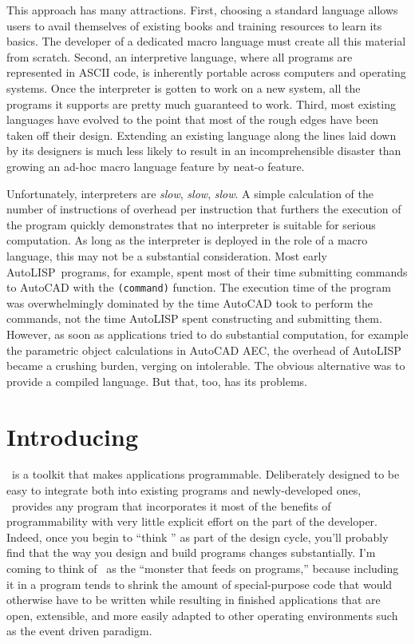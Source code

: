 \documentclass[twocolumn]{article}
\begin{document}
This approach has many attractions.  First, choosing a standard
language allows users to avail themselves of existing books and
training resources to learn its basics.  The developer of a
dedicated macro language must create all this material from scratch.
Second, an interpretive language, where all programs are represented
in ASCII code, is inherently portable across computers and operating
systems.  Once the interpreter is gotten to work on a new system, all
the programs it supports are pretty much guaranteed to work.  Third,
most existing languages have evolved to the point that most of the
rough edges have been taken off their design.  Extending an existing
language along the lines laid down by its designers is much
less likely to result in an incomprehensible disaster than growing an
ad-hoc macro language feature by neat-o feature.

Unfortunately, interpreters are {\em slow}, {\em slow}, {\em slow}.
A simple calculation of the number of instructions of overhead per
instruction that furthers the execution of the program quickly
demonstrates that no interpreter is suitable for serious computation.
As long as the interpreter is deployed in the role of a macro
language, this may not be a substantial consideration.  Most early
AutoLISP\rtm\ programs, for example, spent most of their time submitting
commands to AutoCAD with the {\tt (command)} function.  The execution
time of the program was overwhelmingly dominated by the time AutoCAD
took to perform the commands, not the time AutoLISP spent constructing
and submitting them.  However, as soon as applications tried to do
substantial computation, for example the parametric object
calculations in AutoCAD AEC, the overhead of AutoLISP became a
crushing burden, verging on intolerable.  The obvious alternative
was to provide a compiled language.  But that, too, has its problems.

\section{Introducing \atlast}

\atlast\tm\ is a toolkit that makes applications
programmable.  Deliberately designed to be easy to integrate both
into existing programs and newly-developed ones, \atlast\ provides
any program that incorporates it most of the benefits of programmability
with very little explicit effort on the part of the developer.
Indeed, once you begin to ``think \atlast'' as part of the design
cycle, you'll probably find that the way you design and build programs
changes substantially.  I'm coming to think of \atlast\ as the
``monster that feeds on programs,'' because including it in a program
tends to shrink the amount of special-purpose code that would
otherwise have to be written while resulting in finished applications
that are open, extensible, and more easily adapted to other operating
environments such as the event driven paradigm.
\end{document}

